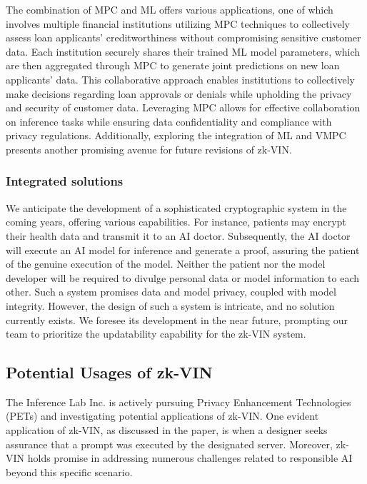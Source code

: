 \documentclass[conference]{IEEEtran}
\begin{document}
The combination of MPC and ML offers various applications, one of which involves multiple financial institutions utilizing MPC techniques to collectively assess loan applicants' creditworthiness without compromising sensitive customer data. Each institution securely shares their trained ML model parameters, which are then aggregated through MPC to generate joint predictions on new loan applicants' data. This collaborative approach enables institutions to collectively make decisions regarding loan approvals or denials while upholding the privacy and security of customer data. Leveraging MPC allows for effective collaboration on inference tasks while ensuring data confidentiality and compliance with privacy regulations. Additionally, exploring the integration of ML and VMPC presents another promising avenue for future revisions of zk-VIN.


\subsubsection{Integrated solutions}

We anticipate the development of a sophisticated cryptographic system in the coming years, offering various capabilities. For instance, patients may encrypt their health data and transmit it to an AI doctor. Subsequently, the AI doctor will execute an AI model for inference and generate a proof, assuring the patient of the genuine execution of the model. Neither the patient nor the model developer will be required to divulge personal data or model information to each other. Such a system promises data and model privacy, coupled with model integrity. However, the design of such a system is intricate, and no solution currently exists. We foresee its development in the near future, prompting our team to prioritize the updatability capability for the zk-VIN system.

\subsection{Potential Usages of zk-VIN}
The Inference Lab Inc. is actively pursuing Privacy Enhancement Technologies (PETs) and investigating potential applications of zk-VIN. One evident application of zk-VIN, as discussed in the paper, is when a designer seeks assurance that a prompt was executed by the designated server. Moreover, zk-VIN holds promise in addressing numerous challenges related to responsible AI beyond this specific scenario.
\end{document}

